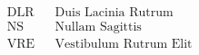  \abbreviation
\begin{eqnarray*}
 \text{DLR} & & \text{Duis Lacinia Rutrum } \\
  \text{NS} & & \text{Nullam Sagittis} \\
  \text{VRE} & & \text{Vestibulum Rutrum Elit }\\
\end{eqnarray*}
